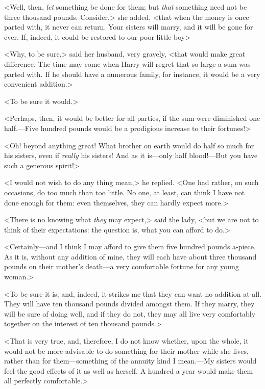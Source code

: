 <Well, then, \textit{let} something be done for them; but \textit{that} something need not be three thousand pounds. Consider,> she added, <that when the money is once parted with, it never can return. Your sisters will marry, and it will be gone for ever. If, indeed, it could be restored to our poor little boy\longdash>

<Why, to be sure,> said her husband, very gravely, <that would make great difference. The time may come when Harry will regret that so large a sum was parted with. If he should have a numerous family, for instance, it would be a very convenient addition.>

<To be sure it would.>

<Perhaps, then, it would be better for all parties, if the sum were diminished one half.—Five hundred pounds would be a prodigious increase to their fortunes!>

<Oh! beyond anything great! What brother on earth would do half so much for his sisters, even if \textit{really} his sisters! And as it is—only half blood!—But you have such a generous spirit!>

<I would not wish to do any thing mean,> he replied. <One had rather, on such occasions, do too much than too little. No one, at least, can think I have not done enough for them: even themselves, they can hardly expect more.>

<There is no knowing what \textit{they} may expect,> said the lady, <but we are not to think of their expectations: the question is, what you can afford to do.>

<Certainly—and I think I may afford to give them five hundred pounds a-piece. As it is, without any addition of mine, they will each have about three thousand pounds on their mother's death—a very comfortable fortune for any young woman.>

<To be sure it is; and, indeed, it strikes me that they can want no addition at all. They will have ten thousand pounds divided amongst them. If they marry, they will be sure of doing well, and if they do not, they may all live very comfortably together on the interest of ten thousand pounds.>

<That is very true, and, therefore, I do not know whether, upon the whole, it would not be more advisable to do something for their mother while she lives, rather than for them—something of the annuity kind I mean.—My sisters would feel the good effects of it as well as herself. A hundred a year would make them all perfectly comfortable.>


